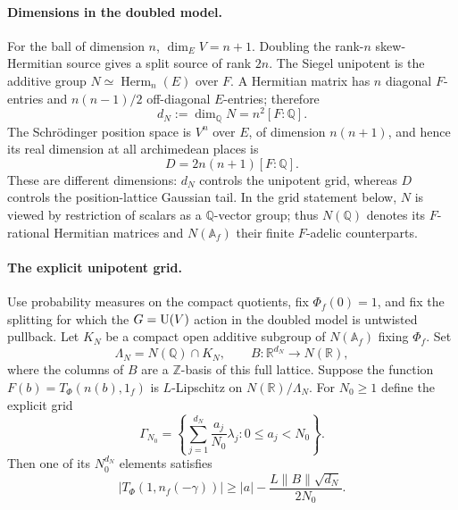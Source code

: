 \documentclass[11pt]{article}
\newcommand{\Q}{\mathbb Q}\newcommand{\C}{\mathbb C}\newcommand{\Z}{\mathbb Z}\newcommand{\R}{\mathbb R}\newcommand{\A}{\mathbb A}\newcommand{\OO}{\mathcal O}
\theoremstyle{definition}\newtheorem{definition}[theorem]{Definition}\newtheorem{remark}[theorem]{Remark}
\begin{document}
\paragraph{Dimensions in the doubled model.}
For the ball of dimension $n$, $\dim_E V=n+1$. Doubling the
rank-$n$ skew-Hermitian source gives a split source of rank $2n$.
The Siegel unipotent is the additive group
$N\simeq\operatorname{Herm}_n(E)$ over $F$. A Hermitian matrix has
$n$ diagonal $F$-entries and $n(n-1)/2$ off-diagonal $E$-entries;
therefore
\[
 d_N:=\dim_\Q N=n^2[F:\Q].
\]
The Schr\"odinger position space is $V^n$ over $E$, of dimension
$n(n+1)$, and hence its real dimension at all archimedean places is
\[
 D=2n(n+1)[F:\Q].
\]
These are different dimensions: $d_N$ controls the unipotent grid,
whereas $D$ controls the position-lattice Gaussian tail.
In the grid statement below, $N$ is viewed by restriction of
scalars as a $\Q$-vector group; thus $N(\Q)$ denotes its
$F$-rational Hermitian matrices and $N(\A_f)$ their finite
$F$-adelic counterparts.

\paragraph{The explicit unipotent grid.}
Use probability measures on the compact quotients, fix
$\Phi_f(0)=1$, and fix the splitting for which the $G=\operatorname{U}(V)$
action in the doubled model is untwisted pullback. Let $K_N$ be
a compact open additive subgroup of $N(\A_f)$ fixing $\Phi_f$.
Set
\[
 \Lambda_N=N(\Q)\cap K_N,
 \qquad B:\R^{d_N}\longrightarrow N(\R),
\]
where the columns of $B$ are a $\Z$-basis of this full lattice.
Suppose the function
$F(b)=T_\Phi(n(b),1_f)$ is $L$-Lipschitz on
$N(\R)/\Lambda_N$. For $N_0\geq1$ define the explicit grid
\[
 \Gamma_{N_0}=
 \left\{\sum_{j=1}^{d_N}\frac{a_j}{N_0}\lambda_j:
                         0\leq a_j<N_0\right\}.
\]
Then one of its $N_0^{d_N}$ elements satisfies
\begin{equation}\label{Q10-grid}
 |T_\Phi(1,n_f(-\gamma))|
    \geq |a|-\frac{L\|B\|\sqrt{d_N}}{2N_0}.
\end{equation}
\end{document}
